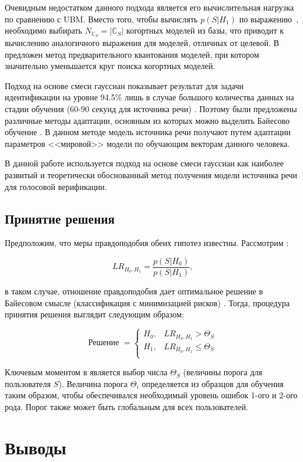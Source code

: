 Очевидным недостатком данного подхода является его вычислительная нагрузка по сравнению с UBM. Вместо того, чтобы вычислять $p(S|H_1)$ по выражению~, необходимо выбирать $N_{\mathbb{C}_S} = |\mathbb{C}_S|$ когортных моделей из базы, что приводит к вычислению аналогичного выражения для  моделей, отличных от целевой. В \cite{Kinnunen04cohort} предложен метод предварительного квантования моделей, при котором значительно уменьшается круг поиска когортных моделей.

Подход на основе смеси гауссиан показывает результат для задачи идентификации на уровне 94.5\% лишь в случае большого количества данных на стадии обучения (60-90 секунд для источника речи) \cite{Reynolds95gmm}. Поэтому были предложены различные методы адаптации, основным из которых можно выделить Байесово обучение \cite{Reynolds00speakerverification}. В данном методе модель источника речи получают путем адаптации параметров <<мировой>> модели по обучающим векторам данного человека.

В данной работе используется подход на основе смеси гауссиан как наиболее развитый и теоретически обоснованный метод получения модели источника речи для голосовой верификации.

\subsection{Принятие решения}

Предположим, что меры правдоподобия обеих гипотез  известны. Рассмотрим :

\begin{equation}
\label{eq:lr}
LR_{H_0, H_1} = \frac{p(S|H_0)}{p(S|H_1)},
\end{equation}

\noindent в таком случае, отношение правдоподобия дает оптимальное решение в Байесовом смысле (классификация с минимизацией рисков) \cite{Fukunaga90Intro}. Тогда, процедура принятия решения выглядит следующим образом:

\begin{equation}
\label{eq:decision}
\textrm{Решение } = \left\{ 
    \begin{array}{ll}
        H_0, & LR_{H_0, H_1} > \Theta_{S} \\
        H_1, & LR_{H_0, H_1} \leq \Theta_{S} \\
    \end{array}
\right.
\end{equation}

Ключевым моментом в  является выбор числа $\Theta_{S}$ (величины порога для пользователя $S$). Величина порога $\Theta_i$ определяется из образцов для обучения таким образом, чтобы обеспечивался необходимый уровень ошибок 1-ого и 2-ого рода. Порог также может быть глобальным для всех пользователей.

\section{Выводы}
